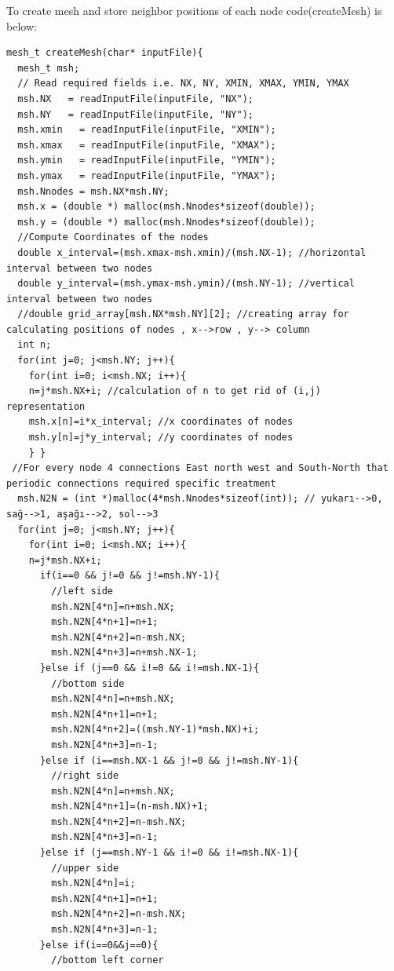 \documentclass{article}
\begin{document}
\clearpage
To create mesh and store neighbor positions of each node code(createMesh) is below: 
\begin{verbatim}
mesh_t createMesh(char* inputFile){
  mesh_t msh; 
  // Read required fields i.e. NX, NY, XMIN, XMAX, YMIN, YMAX
  msh.NX   = readInputFile(inputFile, "NX");
  msh.NY   = readInputFile(inputFile, "NY");
  msh.xmin   = readInputFile(inputFile, "XMIN");
  msh.xmax   = readInputFile(inputFile, "XMAX");
  msh.ymin   = readInputFile(inputFile, "YMIN");
  msh.ymax   = readInputFile(inputFile, "YMAX");
  msh.Nnodes = msh.NX*msh.NY;
  msh.x = (double *) malloc(msh.Nnodes*sizeof(double));
  msh.y = (double *) malloc(msh.Nnodes*sizeof(double));
  //Compute Coordinates of the nodes
  double x_interval=(msh.xmax-msh.xmin)/(msh.NX-1); //horizontal interval between two nodes 
  double y_interval=(msh.ymax-msh.ymin)/(msh.NY-1); //vertical interval between two nodes 
  //double grid_array[msh.NX*msh.NY][2]; //creating array for calculating positions of nodes , x-->row , y--> column 
  int n;
  for(int j=0; j<msh.NY; j++){
    for(int i=0; i<msh.NX; i++){
    n=j*msh.NX+i; //calculation of n to get rid of (i,j) representation
    msh.x[n]=i*x_interval; //x coordinates of nodes
    msh.y[n]=j*y_interval; //y coordinates of nodes 
    } }
 //For every node 4 connections East north west and South-North that periodic connections required specific treatment
  msh.N2N = (int *)malloc(4*msh.Nnodes*sizeof(int)); // yukarı-->0, sağ-->1, aşağı-->2, sol-->3 
  for(int j=0; j<msh.NY; j++){
    for(int i=0; i<msh.NX; i++){
    n=j*msh.NX+i;
      if(i==0 && j!=0 && j!=msh.NY-1){
        //left side
        msh.N2N[4*n]=n+msh.NX; 
        msh.N2N[4*n+1]=n+1;
        msh.N2N[4*n+2]=n-msh.NX; 
        msh.N2N[4*n+3]=n+msh.NX-1; 
      }else if (j==0 && i!=0 && i!=msh.NX-1){
        //bottom side
        msh.N2N[4*n]=n+msh.NX; 
        msh.N2N[4*n+1]=n+1;
        msh.N2N[4*n+2]=((msh.NY-1)*msh.NX)+i; 
        msh.N2N[4*n+3]=n-1; 
      }else if (i==msh.NX-1 && j!=0 && j!=msh.NY-1){
        //right side 
        msh.N2N[4*n]=n+msh.NX; 
        msh.N2N[4*n+1]=(n-msh.NX)+1;
        msh.N2N[4*n+2]=n-msh.NX; 
        msh.N2N[4*n+3]=n-1; 
      }else if (j==msh.NY-1 && i!=0 && i!=msh.NX-1){
        //upper side 
        msh.N2N[4*n]=i; 
        msh.N2N[4*n+1]=n+1;
        msh.N2N[4*n+2]=n-msh.NX; 
        msh.N2N[4*n+3]=n-1; 
      }else if(i==0&&j==0){
        //bottom left corner 

\end{verbatim}
\end{document}
